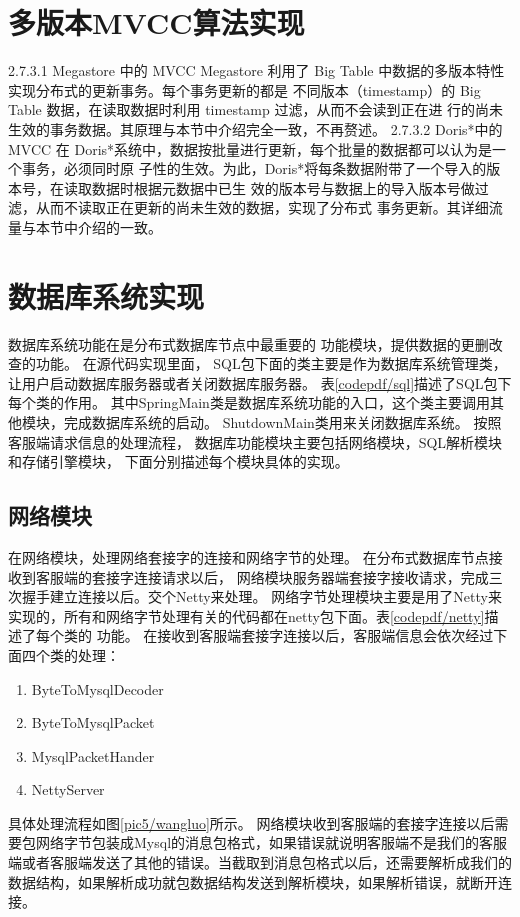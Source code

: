 \section{多版本MVCC算法实现}
2.7.3.1 Megastore 中的 MVCC
Megastore 利用了 Big Table 中数据的多版本特性实现分布式的更新事务。每个事务更新的都是
不同版本（timestamp）的 Big Table 数据，在读取数据时利用 timestamp 过滤，从而不会读到正在进
行的尚未生效的事务数据。其原理与本节中介绍完全一致，不再赘述。
2.7.3.2 Doris*中的 MVCC
在 Doris*系统中，数据按批量进行更新，每个批量的数据都可以认为是一个事务，必须同时原
子性的生效。为此，Doris*将每条数据附带了一个导入的版本号，在读取数据时根据元数据中已生
效的版本号与数据上的导入版本号做过滤，从而不读取正在更新的尚未生效的数据，实现了分布式
事务更新。其详细流量与本节中介绍的一致。
\section{数据库系统实现}
数据库系统功能在是分布式数据库节点中最重要的
功能模块，提供数据的更删改查的功能。
在源代码实现里面，
SQL包下面的类主要是作为数据库系统管理类，
让用户启动数据库服务器或者关闭数据库服务器。
表\ref{codepdf/sql}描述了SQL包下每个类的作用。
其中SpringMain类是数据库系统功能的入口，这个类主要调用其他模块，完成数据库系统的启动。
ShutdownMain类用来关闭数据库系统。
按照客服端请求信息的处理流程，
数据库功能模块主要包括网络模块，SQL解析模块和存储引擎模块，
下面分别描述每个模块具体的实现。
\subsection{网络模块}
在网络模块，处理网络套接字的连接和网络字节的处理。
在分布式数据库节点接收到客服端的套接字连接请求以后，
网络模块服务器端套接字接收请求，完成三次握手建立连接以后。交个Netty来处理。
网络字节处理模块主要是用了Netty来实现的，所有和网络字节处理有关的代码都在netty包下面。表\ref{codepdf/netty}描述了每个类的
功能。
在接收到客服端套接字连接以后，客服端信息会依次经过下面四个类的处理：
\begin{enumerate}
	\item ByteToMysqlDecoder
	\item ByteToMysqlPacket
	\item MysqlPacketHander
	\item NettyServer
\end{enumerate}
具体处理流程如图\ref{pic5/wangluo}所示。
网络模块收到客服端的套接字连接以后需要包网络字节包装成Mysql的消息包格式，如果错误就说明客服端不是我们的客服端或者客服端发送了其他的错误。当截取到消息包格式以后，还需要解析成我们的数据结构，如果解析成功就包数据结构发送到解析模块，如果解析错误，就断开连接。


